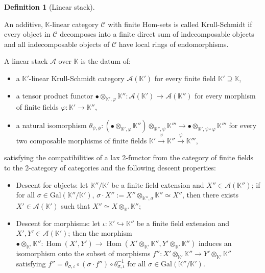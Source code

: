 \documentclass[11pt,english]{article}
\numberwithin{equation}{section}
\numberwithin{figure}{section}
\theoremstyle{definition}
\newtheorem{df}{Definition}[subsection]
\theoremstyle{plain}
\theoremstyle{remark}
\DeclareMathOperator{\Hom}{Hom}
\newcommand\KK{\mathbb{K}}
\begin{document}
\begin{df}[Linear stack] \label{Def/LinearStack}

An additive, $\KK$-linear category $\mathcal{C}$ with finite Hom-sets
is called Krull-Schmidt if every object in $\mathcal{C}$ decomposes
into a finite direct sum of indecomposable objects and all indecomposable
objects of $\mathcal{C}$ have local rings of endomorphisms.

A linear stack $\mathcal{A}$ over $\KK$ is the datum of:
\begin{itemize}
\item a $\KK'$-linear Krull-Schmidt category $\mathcal{A}(\KK')$ for every
finite field $\KK'\supseteq\KK$,
\item a tensor product functor $\bullet\otimes_{\KK',\varphi}\KK'':\mathcal{A}(\KK')\rightarrow\mathcal{A}(\KK'')$
for every morphism of finite fields $\varphi:\KK'\rightarrow\KK''$,
\item a natural isomorphism $\theta_{\psi,\phi}:(\bullet\otimes_{\KK',\varphi}\KK'')\otimes_{\KK'',\psi}\KK'''\rightarrow\bullet\otimes_{\KK',\psi\circ\varphi}\KK'''$
for every two composable morphisms of finite fields $\KK'\overset{\varphi}{\rightarrow}\KK''\overset{\psi}{\rightarrow}\KK'''$,
\end{itemize}
satisfying the compatibilities of a lax 2-functor from the category
of finite fields to the 2-category of categories \cite[\S 3.1.2.]{Vis05}
and the following descent properties:
\begin{itemize}
\item Descent for objects: let $\KK''/\KK'$ be a finite field extension
and $X''\in\mathcal{A}(\KK'')$; if for all $\sigma\in\mathrm{Gal}(\KK''/\KK')$,
$\sigma\cdot X'':=X''\otimes_{\KK'',\sigma}\KK''\simeq X''$, then
there exists $X'\in\mathcal{A}(\KK')$ such that $X''\simeq X\otimes_{\KK'}\KK''$;
\item Descent for morphisms: let $\iota:\KK'\hookrightarrow\KK''$ be a
finite field extension and $X',Y'\in\mathcal{A}(\KK')$; then the
morphism $\bullet\otimes_{\KK'}\KK'':\Hom(X',Y')\rightarrow\Hom(X'\otimes_{\KK'}\KK'',Y'\otimes_{\KK'}\KK'')$
induces an isomorphism onto the subset of morphisms $f'':X'\otimes_{\KK'}\KK''\rightarrow Y'\otimes_{\KK'}\KK''$
satisfying $f''=\theta_{\sigma,\iota}\circ(\sigma\cdot f'')\circ\theta_{\sigma,\iota}^{-1}$
for all $\sigma\in\mathrm{Gal}(\KK''/\KK')$.
\end{itemize}
\end{df}
\end{document}
